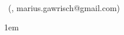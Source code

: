 
\begin{small}
\parindent 0pt
\meta \\ \autor\ (\matrikelnummer, marius.gawrisch@gmail.com)
\end{small}

\vspace{0.5cm}
\parindent 1em
\onehalfspacing
